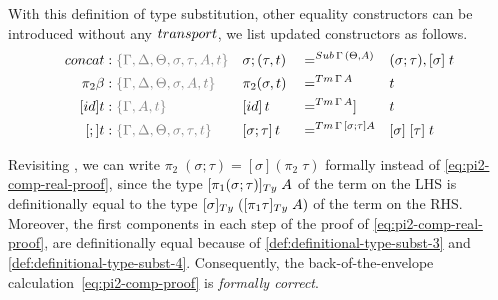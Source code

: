 \documentclass[a4paper,UKenglish,numberwithinsect,cleveref,thm-restate]{lipics-v2021}
\begin{document}
With this definition of type substitution, other equality constructors can be introduced without any $\transp$, we list updated constructors as follows.
\begin{alignat*}{5}
  \mathsf{concat} & : \implicit{\Gamma, \Delta, \Theta, \sigma, \tau, A, t} &&\sigma ; (\tau , t) && =^{\Sub\,\Gamma\,(\Theta, A)} &&  (\sigma ; \tau), [ \sigma ]\;t \\
  \pi_2\beta      & : \implicit{\Gamma, \Delta, \Theta, \sigma, A, t} && \pi_2(\sigma , t)        && =^{\Tm\,\Gamma\, A} &&  t \\
  [\idS]t         & : \implicit{\Gamma, A, t} && {[\idS]\,t}          && =^{\Tm\,\Gamma\,A}] && t \\
  [;]t            & : \implicit{\Gamma, \Delta, \Theta, \sigma, \tau, t} && {[\sigma ; \tau]\,t} && =^{\Tm\,\Gamma\,[\sigma ; \tau] A} && {[ \sigma ]\;[ \tau ]\;t}
\end{alignat*}

\begin{example}
  Revisiting , we can write $\pi_2\;(\sigma; \tau) = [\sigma](\pi_2\;\tau)$ formally instead of \eqref{eq:pi2-comp-real-proof}, since the type $[\pi_1(\sigma;\tau)]_{\Ty}\;A$ of the term on the LHS is definitionally equal to the type $[\sigma]_\Ty\;([\pi_1\tau]_\Ty\;A)$ of the term on the RHS.
  Moreover, the first components in each step of the proof of \eqref{eq:pi2-comp-real-proof}, are definitionally equal because of \eqref{def:definitional-type-subst-3} and \eqref{def:definitional-type-subst-4}.
  Consequently, the back-of-the-envelope calculation~\eqref{eq:pi2-comp-proof} is \emph{formally correct}.
\end{example}
\end{document}
